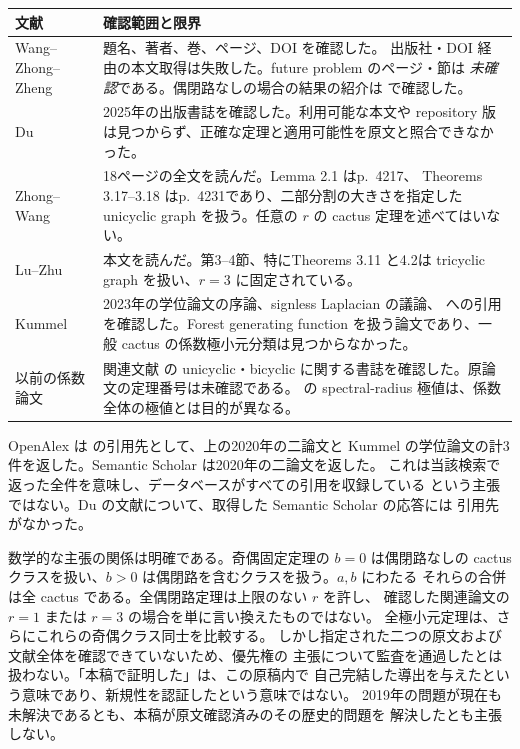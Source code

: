 \documentclass[12pt]{amsart}
\theoremstyle{definition}
\theoremstyle{remark}
\numberwithin{equation}{section}
\begin{document}
\begin{center}\small
\begin{tabular}{p{}p{}}
文献&確認範囲と限界\\\hline
Wang--Zhong--Zheng \cite{ja-wzz}&題名、著者、巻、ページ、DOI を確認した。
出版社・DOI 経由の本文取得は失敗した。future problem のページ・節は
\emph{未確認}である。偶閉路なしの場合の結果の紹介は
\cite[p.~4216]{ja-zw} で確認した。\\
Du \cite{ja-du}&2025年の出版書誌を確認した。利用可能な本文や repository
版は見つからず、正確な定理と適用可能性を原文と照合できなかった。\\
Zhong--Wang \cite{ja-zw}&18ページの全文を読んだ。Lemma 2.1 はp.~4217、
Theorems 3.17--3.18 はp.~4231であり、二部分割の大きさを指定した
unicyclic graph を扱う。任意の $r$ の cactus 定理を述べてはいない。\\
Lu--Zhu \cite{ja-lz}&本文を読んだ。第3--4節、特にTheorems 3.11 と4.2は
tricyclic graph を扱い、$r=3$ に固定されている。\\
Kummel \cite{ja-kummel}&2023年の学位論文の序論、signless Laplacian
の議論、\cite{ja-wzz} への引用を確認した。Forest generating function
を扱う論文であり、一般 cactus の係数極小元分類は見つからなかった。\\
以前の係数論文&関連文献 \cite{ja-lts,ja-zz} の unicyclic・bicyclic
に関する書誌を確認した。原論文の定理番号は未確認である。
\cite{ja-cz} の spectral-radius 極値は、係数全体の極値とは目的が異なる。\\
\end{tabular}
\end{center}

OpenAlex は \cite{ja-wzz} の引用先として、上の2020年の二論文と Kummel
の学位論文の計3件を返した。Semantic Scholar は2020年の二論文を返した。
これは当該検索で返った全件を意味し、データベースがすべての引用を収録している
という主張ではない。Du の文献について、取得した Semantic Scholar の応答には
引用先がなかった。

数学的な主張の関係は明確である。奇偶固定定理の $b=0$ は偶閉路なしの
cactus クラスを扱い、$b>0$ は偶閉路を含むクラスを扱う。$a,b$ にわたる
それらの合併は全 cactus である。全偶閉路定理は上限のない $r$ を許し、
確認した関連論文の $r=1$ または $r=3$ の場合を単に言い換えたものではない。
全極小元定理は、さらにこれらの奇偶クラス同士を比較する。
しかし指定された二つの原文および文献全体を確認できていないため、優先権の
主張について監査を通過したとは扱わない。「本稿で証明した」は、この原稿内で
自己完結した導出を与えたという意味であり、新規性を認証したという意味ではない。
2019年の問題が現在も未解決であるとも、本稿が原文確認済みのその歴史的問題を
解決したとも主張しない。
\end{document}
